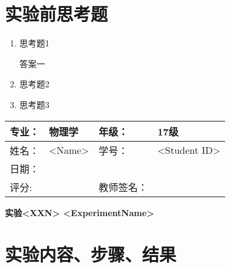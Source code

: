 \documentclass{ctexart}
\numberwithin{equation}{section}%
\newcommand{\ExpTitle}{实验<XXN> <ExperimentName>}
\newcommand{\stuName}{<Name>}
\newcommand{\stuID}{<Student ID>}
\theoremstyle{ansstyle}
\begin{document}
\section{实验前思考题}
\begin{enumerate}
    \item 思考题1
    \begin{ans}
        答案一
    \end{ans}
    \item 思考题2
    \item 思考题3
\end{enumerate}


\newpage

\begin{center}
    \begin{tabular}{|p{2cm}|p{4cm}|p{4cm}|p{4cm}|}
        \hline
        专业： & 物理学 & 年级： & 17级 \\
        \hline
        姓名： & \stuName & 学号： & \stuID \\
        \hline
        日期： &  & & \\
        \hline
        评分:  &   & 教师签名：& \\
        \hline
    \end{tabular}
\end{center}

\begin{center}
    \LARGE{\textbf{\ExpTitle}}
\end{center}


\section{实验内容、步骤、结果}


\end{document}
